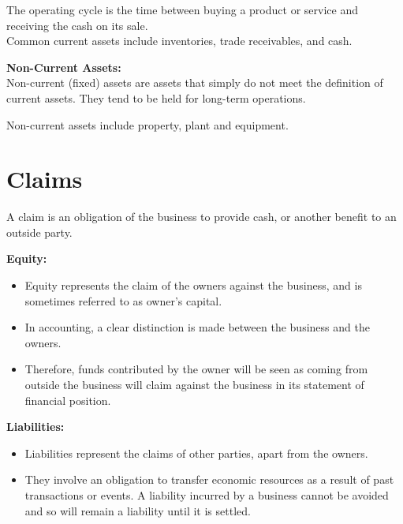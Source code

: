 \documentclass{report}
\newenvironment{blackbox}[1][Black]
  {\begin{tcolorbox}[colframe=#1,colback=white]}
  {\end{tcolorbox}}
\begin{document}
The operating cycle is the time between buying a product or service and receiving the cash on its sale.\\
Common current assets include inventories, trade receivables, and cash.

\begin{blackbox}
    \textbf{Non-Current Assets:}\\
    Non-current (fixed) assets are assets that simply do not meet the definition of current assets. They tend to be held for long-term operations.
\end{blackbox}

Non-current assets include property, plant and equipment.
\section{Claims}

A claim is an obligation of the business to provide cash, or another benefit to an outside party.

\begin{blackbox}
    \textbf{Equity:}
    \begin{itemize}
        \item Equity represents the claim of the owners against the business, and is sometimes referred to as owner's capital.
        \item In accounting, a clear distinction is made between the business and the owners. 
        \item Therefore, funds contributed by the owner will be seen as coming from outside the business will claim against the business in its statement of financial position.
    \end{itemize}
\end{blackbox}

\begin{blackbox}
    \textbf{Liabilities:}
    \begin{itemize}
        \item Liabilities represent the claims of other parties, apart from the owners.
        \item They involve an obligation to transfer economic resources as a result of past transactions or events. A liability incurred by a business cannot be avoided and so will remain a liability until it is settled.
    \end{itemize}
\end{blackbox}
\end{document}
